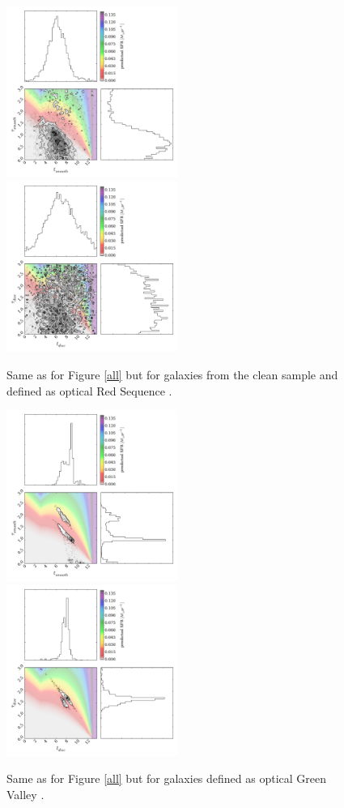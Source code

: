 \documentclass{mn2e}
\begin{document}
\begin{figure}
\includegraphics[width=0.4975\textwidth]{red_s_smooth_clean.pdf}
\includegraphics[width=0.4975\textwidth]{red_s_disc_clean.pdf}
\caption{Same as for Figure \ref{all} but for galaxies from the clean sample and defined as optical Red Sequence \cite{Baldry}.}
\label{red_s_clean}
\end{figure}

\begin{figure}
\includegraphics[width=0.4975\textwidth]{gv_smooth.pdf}
\includegraphics[width=0.4975\textwidth]{gv_disc.pdf}
\caption{Same as for Figure \ref{all} but for galaxies defined as optical Green Valley \cite{Baldry}.}
\label{gv}
\end{figure}
\end{document}

